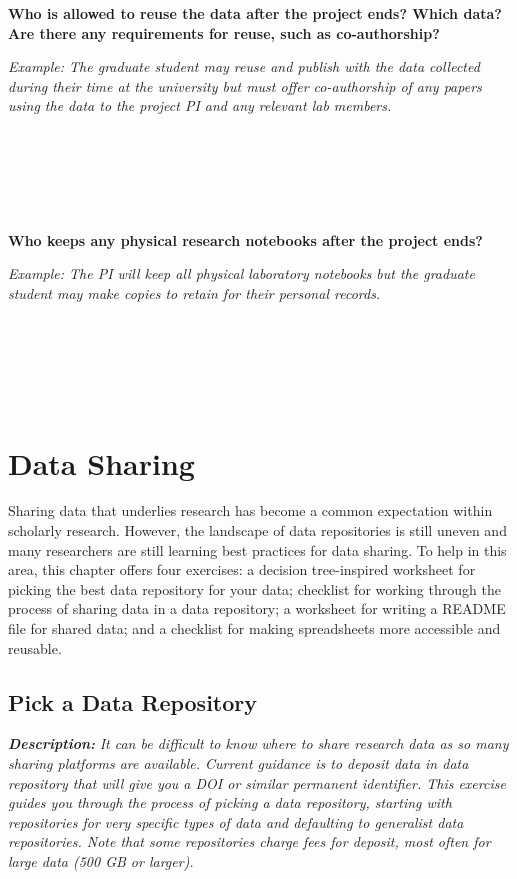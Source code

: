 \documentclass[
]{book}
\begin{document}
\textbf{Who is allowed to reuse the data after the project ends? Which data? Are there any requirements for reuse, such as co-authorship?}

\emph{Example: The graduate student may reuse and publish with the data collected during their time at the university but must offer co-authorship of any papers using the data to the project PI and any relevant lab members.}

~

~

~

\textbf{Who keeps any physical research notebooks after the project ends?}

\emph{Example: The PI will keep all physical laboratory notebooks but the graduate student may make copies to retain for their personal records.}

~

~

~

\hypertarget{data-sharing}{%
\chapter{Data Sharing}\label{data-sharing}}

Sharing data that underlies research has become a common expectation within scholarly research. However, the landscape of data repositories is still uneven and many researchers are still learning best practices for data sharing. To help in this area, this chapter offers four exercises: a decision tree-inspired worksheet for picking the best data repository for your data; checklist for working through the process of sharing data in a data repository; a worksheet for writing a README file for shared data; and a checklist for making spreadsheets more accessible and reusable.

\hypertarget{data-repository}{%
\section{Pick a Data Repository}\label{data-repository}}

\textbf{\emph{Description:}} \emph{It can be difficult to know where to share research data as so many sharing platforms are available. Current guidance is to deposit data in data repository that will give you a DOI or similar permanent identifier. This exercise guides you through the process of picking a data repository, starting with repositories for very specific types of data and defaulting to generalist data repositories. Note that some repositories charge fees for deposit, most often for large data (500 GB or larger).}
\end{document}

